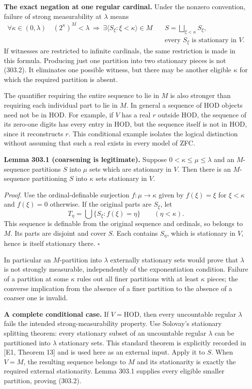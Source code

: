\documentclass[11pt]{article}
\begin{document}
\textbf{The exact negation at one regular cardinal.} Under the nonzero convention, failure of strong measurability at $\lambda$ means
\[
 \begin{split}
 \forall\kappa\in(0,\lambda)\quad
 (2^\kappa)^M<\lambda\ \Longrightarrow\ 
 \exists\langle S_\xi:\xi<\kappa\rangle\in M\quad
 &S=\bigsqcup_{\xi<\kappa}S_\xi,\\
 &\text{every }S_\xi\text{ is stationary in }V.
 \end{split}
 \tag{303.2}
\]
If witnesses are restricted to infinite cardinals, the same restriction is made in this formula. Producing just one partition into two stationary pieces is not (303.2). It eliminates one possible witness, but there may be another eligible $\kappa$ for which the required partition is absent.

The quantifier requiring the entire sequence to lie in $M$ is also stronger than requiring each individual part to lie in $M$. In general a sequence of HOD objects need not be in HOD. For example, if $V$ has a real $r$ outside HOD, the sequence of its zero-one digits has every entry in HOD, but the sequence itself is not in HOD, since it reconstructs $r$. This conditional example isolates the logical distinction without assuming that such a real exists in every model of ZFC.

\textbf{Lemma 303.1 (coarsening is legitimate).} Suppose $0<\kappa\leq\mu\leq\lambda$ and an $M$-sequence partitions $S$ into $\mu$ sets which are stationary in $V$. Then there is an $M$-sequence partitioning $S$ into $\kappa$ sets stationary in $V$.

\emph{Proof.} Use the ordinal-definable surjection $f:\mu\to\kappa$ given by $f(\xi)=\xi$ for $\xi<\kappa$ and $f(\xi)=0$ otherwise. If the original parts are $S_\xi$, let
\[
 T_\eta=\bigcup\{S_\xi:f(\xi)=\eta\}\qquad(\eta<\kappa).
\]
This sequence is definable from the original sequence and ordinals, so belongs to $M$. Its parts are disjoint and cover $S$. Each contains $S_\eta$, which is stationary in $V$, hence is itself stationary there. $\square$

In particular an $M$-partition into $\lambda$ externally stationary sets would prove that $\lambda$ is not strongly measurable, independently of the exponentiation condition. Failure of a partition at some $\kappa$ rules out all finer partitions with at least $\kappa$ pieces; the converse implication from the absence of a finer partition to the absence of a coarser one is invalid.

\textbf{A complete conditional case.} If $V=\mathrm{HOD}$, then every uncountable regular $\lambda$ fails the intended strong-measurability property. Use Solovay's stationary splitting theorem: every stationary subset of an uncountable regular $\lambda$ can be partitioned into $\lambda$ stationary sets. This standard theorem is explicitly recorded in [E1, Theorem 13] and is used here as an external input. Apply it to $S$. When $V=M$, the resulting sequence belongs to $M$ and its stationarity is exactly the required external stationarity. Lemma 303.1 supplies every eligible smaller partition, proving (303.2).
\end{document}
